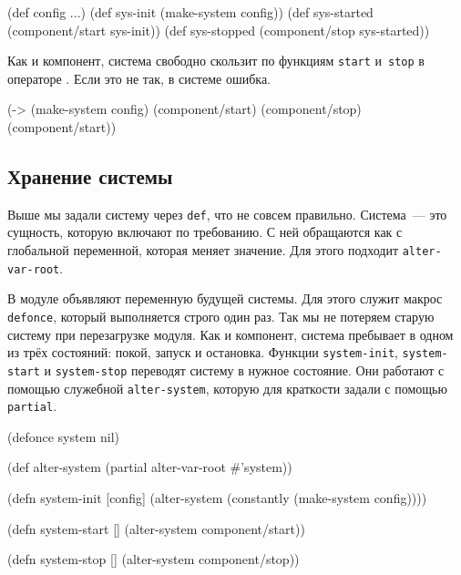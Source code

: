 \else

\begin{english}
  \begin{clojure}
(def config {...})
(def sys-init (make-system config))
(def sys-started (component/start sys-init))
(def sys-stopped (component/stop sys-started))
  \end{clojure}
\end{english}

\fi

Как и компонент, система свободно скользит по функциям \verb|start|
и~\verb|stop| в операторе \arr. Если это не так, в системе ошибка.

\begin{english}
  \begin{clojure}
(-> (make-system config)
    (component/start)
    (component/stop)
    (component/start))
  \end{clojure}
\end{english}

\subsection{Хранение системы}


Выше мы задали систему через \verb|def|, что не совсем правильно. Система~--- это
сущность, которую включают по требованию. С ней обращаются как с глобальной
переменной, которая меняет значение. Для этого подходит \verb|alter-var-root|.

В модуле объявляют переменную будущей системы. Для этого служит макрос
\verb|defonce|, который выполняется строго один раз. Так мы не потеряем старую
систему при перезагрузке модуля. Как и компонент, система пребывает в одном из
трёх состояний: покой, запуск и остановка. Функции \verb|system-init|,
\verb|system-start| и \verb|system-stop| переводят систему в нужное
состояние. Они работают с помощью служебной \verb|alter-system|, которую для
краткости задали с помощью \verb|partial|.


\ifx\DEVICETYPE\MOBILE

\begin{english}
  \begin{clojure}
(defonce system nil)

(def alter-system
  (partial alter-var-root #'system))

(defn system-init [config]
  (alter-system
    (constantly (make-system config))))

(defn system-start []
  (alter-system component/start))

(defn system-stop []
  (alter-system component/stop))
  \end{clojure}
\end{english}

